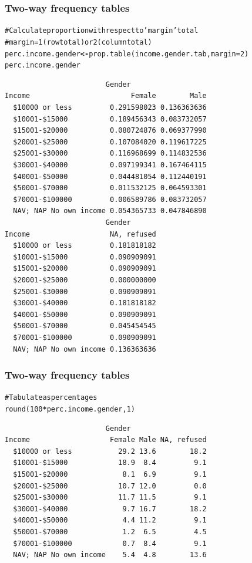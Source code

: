 \documentclass[handout]{beamer}\usepackage[]{graphicx}\usepackage[]{color}
\makeatletter
\newcommand{\hlnum}[1]{\textcolor[rgb]{0.533,0,0.133}{#1}}%
\newcommand{\hlcom}[1]{\textcolor[rgb]{1,0.533,0}{#1}}%
\newcommand{\hlopt}[1]{\textcolor[rgb]{0,0,0}{\textbf{#1}}}%
\newcommand{\hlstd}[1]{\textcolor[rgb]{0,0,0}{#1}}%
\newcommand{\hlkwb}[1]{\textcolor[rgb]{0,0,0.4}{\textbf{#1}}}%
\newcommand{\hlkwc}[1]{\textcolor[rgb]{0,0,0.4}{#1}}%
\newcommand{\hlkwd}[1]{\textcolor[rgb]{0,0.267,0.4}{#1}}%
\newenvironment{kframe}{%
 \def\at@end@of@kframe{}%
 \ifinner\ifhmode%
  \def\at@end@of@kframe{\end{minipage}}%
  \begin{minipage}{\columnwidth}%
 \fi\fi%
 \def\FrameCommand##1{\hskip\@totalleftmargin \hskip-\fboxsep
 \colorbox{shadecolor}{##1}\hskip-\fboxsep
     \hskip-\linewidth \hskip-\@totalleftmargin \hskip\columnwidth}%
 \MakeFramed {\advance\hsize-\width
   \@totalleftmargin\z@ \linewidth\hsize
   \@setminipage}}%
 {\par\unskip\endMakeFramed%
 \at@end@of@kframe}
\newenvironment{knitrout}{}{} %
\makeatother
\begin{document}
\begin{frame}[fragile]
  \frametitle{Two-way frequency tables}
\begin{knitrout}\small
{}\color{fgcolor}\begin{kframe}
\begin{alltt}
\hlcom{# Calculate proportion with respect to 'margin' total}
\hlcom{# margin = 1 (row total) or 2 (column total) }
\hlstd{perc.income.gender} \hlkwb{<-} \hlkwd{prop.table}\hlstd{(income.gender.tab,} \hlkwc{margin}\hlstd{=}\hlnum{2}\hlstd{)}
\hlstd{perc.income.gender}
\end{alltt}
\begin{verbatim}
                        Gender
Income                        Female        Male
  $10000 or less         0.291598023 0.136363636
  $10001-$15000          0.189456343 0.083732057
  $15001-$20000          0.080724876 0.069377990
  $20001-$25000          0.107084020 0.119617225
  $25001-$30000          0.116968699 0.114832536
  $30001-$40000          0.097199341 0.167464115
  $40001-$50000          0.044481054 0.112440191
  $50001-$70000          0.011532125 0.064593301
  $70001-$100000         0.006589786 0.083732057
  NAV; NAP No own income 0.054365733 0.047846890
                        Gender
Income                   NA, refused
  $10000 or less         0.181818182
  $10001-$15000          0.090909091
  $15001-$20000          0.090909091
  $20001-$25000          0.000000000
  $25001-$30000          0.090909091
  $30001-$40000          0.181818182
  $40001-$50000          0.090909091
  $50001-$70000          0.045454545
  $70001-$100000         0.090909091
  NAV; NAP No own income 0.136363636
\end{verbatim}
\end{kframe}
\end{knitrout}
\end{frame}
\begin{frame}[fragile]
  \frametitle{Two-way frequency tables}
\begin{knitrout}
\color{fgcolor}\begin{kframe}
\begin{alltt}
\hlcom{# Tabulate as percentages}
\hlkwd{round}\hlstd{(}\hlnum{100}\hlopt{*}\hlstd{perc.income.gender,} \hlnum{1}\hlstd{)}
\end{alltt}
\begin{verbatim}
                        Gender
Income                   Female Male NA, refused
  $10000 or less           29.2 13.6        18.2
  $10001-$15000            18.9  8.4         9.1
  $15001-$20000             8.1  6.9         9.1
  $20001-$25000            10.7 12.0         0.0
  $25001-$30000            11.7 11.5         9.1
  $30001-$40000             9.7 16.7        18.2
  $40001-$50000             4.4 11.2         9.1
  $50001-$70000             1.2  6.5         4.5
  $70001-$100000            0.7  8.4         9.1
  NAV; NAP No own income    5.4  4.8        13.6
\end{verbatim}
\end{kframe}
\end{knitrout}
\end{frame}
\end{document}

